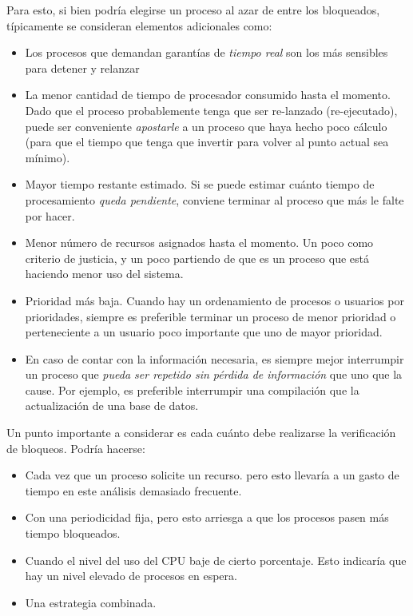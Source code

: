 \documentclass[11pt,fleqn]{book} %
\begin{document}
\begin{itemize}
  Para esto, si bien podría elegirse un proceso al azar de entre los
  bloqueados, típicamente se consideran elementos adicionales como:
\begin{itemize}
\item Los procesos que demandan garantías de \emph{tiempo real} son los más
    sensibles para detener y relanzar
\item La menor cantidad de tiempo de procesador consumido hasta el
    momento. Dado que el proceso probablemente tenga que ser
    re-lanzado (re-ejecutado), puede ser conveniente \emph{apostarle} a un
    proceso que haya hecho poco cálculo (para que el tiempo que tenga
    que invertir para volver al punto actual sea mínimo).
\item Mayor tiempo restante estimado. Si se puede estimar cuánto tiempo
    de procesamiento \emph{queda pendiente}, conviene terminar al proceso
    que más le falte por hacer.
\item Menor número de recursos asignados hasta el momento. Un poco como
    criterio de justicia, y un poco partiendo de que es un proceso que
    está haciendo menor uso del sistema.
\item Prioridad más baja. Cuando hay un ordenamiento de procesos o
    usuarios por prioridades, siempre es preferible terminar un
    proceso de menor prioridad o perteneciente a un usuario poco
    importante que uno de mayor prioridad.
\item En caso de contar con la información necesaria, es siempre mejor
    interrumpir un proceso que \emph{pueda ser repetido sin pérdida de     información} que uno que la cause. Por ejemplo, es preferible
    interrumpir una compilación que la actualización de una base de
    datos.
\end{itemize}
\end{itemize}

Un punto importante a considerar es cada cuánto debe realizarse la
verificación de bloqueos. Podría hacerse:

\begin{itemize}
\item Cada vez que un proceso solicite un recurso. pero esto llevaría a un
  gasto de tiempo en este análisis demasiado frecuente.
\item Con una periodicidad fija, pero esto arriesga a que los procesos
  pasen más tiempo bloqueados.
\item Cuando el nivel del uso del CPU baje de cierto porcentaje. Esto
  indicaría que hay un nivel elevado de procesos en espera.
\item Una estrategia combinada.
\end{itemize}
\end{document}
